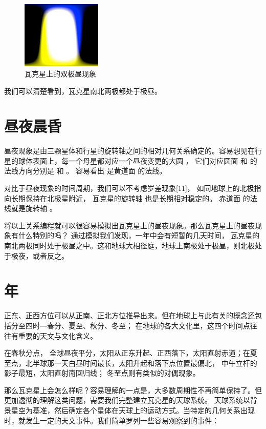 \documentclass[a4paper,10.5pt]{book}
\begin{document}
\begin{figure}[ht]
\centering
\includegraphics[width=1.5in]{images/4_02-day-night.png}
\caption{瓦克星上的双极昼现象}
\end{figure}

我们可以清楚看到，瓦克星南北两极都处于极昼。

\section{昼夜晨昏}

昼夜现象是由三颗星体和行星的旋转轴之间的相对几何关系确定的。容易想见在行星的球体表面上，每一个母星都对应一个昼夜变更的大圆 ，
它们对应圆面   和   的法线方向分别是    和   。 容易看出   是黄道面   的法线。

对比于昼夜现象的时间周期，我们可以不考虑岁差现象[11]， 如同地球上的北极指向长期保持在北极星附近， 瓦克星的旋转轴  也是长期相对稳定的。
赤道面   的法线就是旋转轴  。

将以上关系编程就可以很容易模拟出瓦克星上的昼夜现象。那么瓦克星上的昼夜现象有什么特别的吗？ 通过模拟我们发现，一年中会有短暂的几天时间，
瓦克星的南北两极同时处于极昼之中。这和地球大相径庭，地球上南极处于极昼，则北极处于极夜，或者反之。

\section{年}

正东、正西方位可以从正南、正北方位推导出来。但在地球上与此有关的概念还包括分至四时—春分、夏至、秋分、冬至；
在地球的各大文化里，这四个时间点往往有重要的天文与文化含义。

在春秋分点， 全球昼夜平分，太阳从正东升起、正西落下，太阳直射赤道；在夏至点，北半球那一天白昼时间最长，太阳升起和落下点位置最偏北，
中午立杆的影子最短，太阳直射南回归线； 冬至点则有类似的对偶现象。

那么瓦克星上会怎么样呢？容易理解的一点是，大多数周期性不再简单保持了。但更加透彻的理解这类问题，需要我们完整建立瓦克星的天球系统。
天球系统以背景星空为基准，然后确定各个星体在天球上的运动方式。当特定的几何关系出现时，就发生一定的天文事件。我们简单罗列一些容易观察到的事件：
\end{document}
